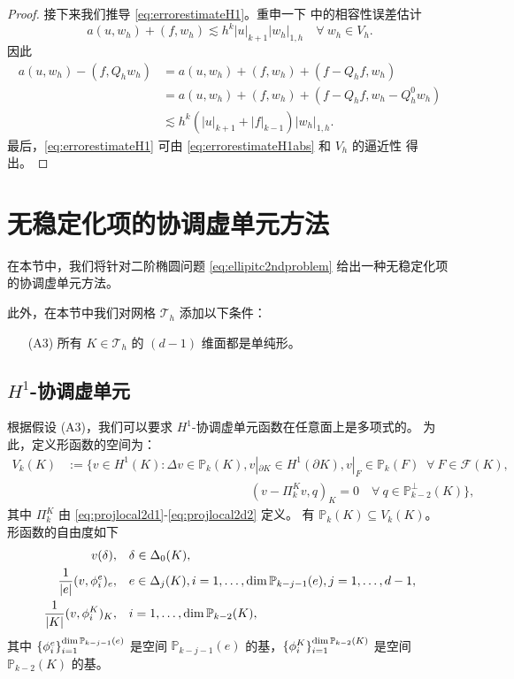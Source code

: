 \begin{proof}
接下来我们推导 \eqref{eq:errorestimateH1}。重申一下 \cite[引理 5.5]{ChenHuang2020ncvem} 中的相容性误差估计
\[
a(u, w_h)+(f, w_h)\lesssim h^k|u|_{k+1}|w_h|_{1,h}\quad\forall~w_h\in V_h.
\]
因此
\begin{align*}
a(u, w_h)-(f, Q_hw_h)
&=a(u, w_h)+(f, w_h)+(f-Q_hf, w_h) \\
&=a(u, w_h)+(f, w_h)+(f-Q_hf, w_h-Q_h^0w_h) \\
&\lesssim h^k(|u|_{k+1}+|f|_{k-1})|w_h|_{1,h}.
\end{align*}
最后，\eqref{eq:errorestimateH1} 可由 \eqref{eq:errorestimateH1abs} 和 $V_h$ 的逼近性 \cite{ChenHuang2020ncvem} 得出。
\end{proof}

\section{无稳定化项的协调虚单元方法}\label{sec:stabfreecfmvem}

在本节中，我们将针对二阶椭圆问题 \eqref{eq:ellipitc2ndproblem}
给出一种无稳定化项的协调虚单元方法。

此外，在本节中我们对网格 $\mathcal T_h$ 添加以下条件：
\begin{itemize}
 \item[(A3)] 所有 $K\in \mathcal T_h$ 的 $(d-1)$ 维面都是单纯形。
\end{itemize}

\subsection{$H^1$-协调虚单元}
根据假设 (A3)，我们可以要求 $H^1$-协调虚单元函数在任意面上是多项式的。
为此，定义形函数的空间为：
\begin{align*}
V_k(K)&:=\big\{ v\in H^1(K): \Delta v\in \mathbb P_{k}(K),  v|_{\partial K}\in H^1(\partial K),  v|_F\in \mathbb P_{k}(F)\;\;\forall~F\in\mathcal F(K),\\
&\qquad\qquad\qquad\qquad\qquad\qquad\qquad\;\;\; (v-\Pi_k^Kv, q)_K=0\quad\forall~q\in\mathbb P_{k-2}^{\perp}(K)\},
\end{align*}
其中 $\Pi_k^K$ 由 \eqref{eq:projlocal2d1}-\eqref{eq:projlocal2d2} 定义。
有 $\mathbb P_k(K)\subseteq V_k(K)$。
形函数的自由度如下
\begin{align}
v(\delta), & \quad \delta\in\Delta_0(K), \label{eq:cfmvemdof1}\\
\frac{1}{|e|}(v, \phi_i^e)_e, & \quad e\in\Delta_j(K), i=1,\ldots, \operatorname{dim}\mathbb P_{k-j-1}(e), j=1,\ldots, d-1, \label{eq:cfmvemdof2}\\
\frac{1}{|K|}(v, \phi_i^K)_K, & \quad i=1,\ldots, \operatorname{dim}\mathbb P_{k-2}(K), \label{eq:cfmvemdof3}
\end{align}
其中 $\{\phi_i^e\}_{i=1}^{\operatorname{dim}\mathbb P_{k-j-1}(e)}$ 是空间 $\mathbb P_{k-j-1}(e)$ 的基，$\{\phi_i^K\}_{i=1}^{\operatorname{dim}\mathbb P_{k-2}(K)}$ 是空间 $\mathbb P_{k-2}(K)$ 的基。

